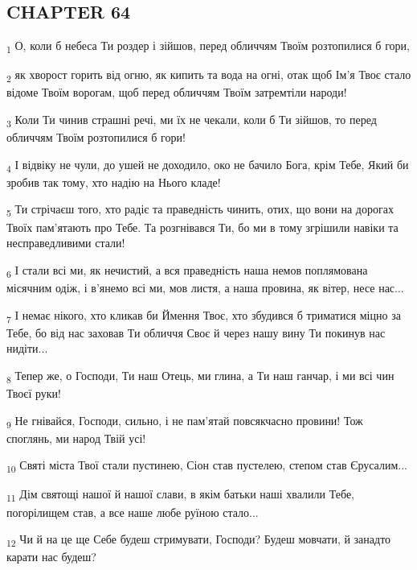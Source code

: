 \subsection{CHAPTER 64}
\begin{tcolorbox}
\textsubscript{1} О, коли б небеса Ти роздер і зійшов, перед обличчям Твоїм розтопилися б гори,
\end{tcolorbox}
\begin{tcolorbox}
\textsubscript{2} як хворост горить від огню, як кипить та вода на огні, отак щоб Ім'я Твоє стало відоме Твоїм ворогам, щоб перед обличчям Твоїм затремтіли народи!
\end{tcolorbox}
\begin{tcolorbox}
\textsubscript{3} Коли Ти чинив страшні речі, ми їх не чекали, коли б Ти зійшов, то перед обличчям Твоїм розтопилися б гори!
\end{tcolorbox}
\begin{tcolorbox}
\textsubscript{4} І відвіку не чули, до ушей не доходило, око не бачило Бога, крім Тебе, Який би зробив так тому, хто надію на Нього кладе!
\end{tcolorbox}
\begin{tcolorbox}
\textsubscript{5} Ти стрічаєш того, хто радіє та праведність чинить, отих, що вони на дорогах Твоїх пам'ятають про Тебе. Та розгнівався Ти, бо ми в тому згрішили навіки та несправедливими стали!
\end{tcolorbox}
\begin{tcolorbox}
\textsubscript{6} І стали всі ми, як нечистий, а вся праведність наша немов поплямована місячним одіж, і в'янемо всі ми, мов листя, а наша провина, як вітер, несе нас...
\end{tcolorbox}
\begin{tcolorbox}
\textsubscript{7} І немає нікого, хто кликав би Ймення Твоє, хто збудився б триматися міцно за Тебе, бо від нас заховав Ти обличчя Своє й через нашу вину Ти покинув нас нидіти...
\end{tcolorbox}
\begin{tcolorbox}
\textsubscript{8} Тепер же, о Господи, Ти наш Отець, ми глина, а Ти наш ганчар, і ми всі чин Твоєї руки!
\end{tcolorbox}
\begin{tcolorbox}
\textsubscript{9} Не гнівайся, Господи, сильно, і не пам'ятай повсякчасно провини! Тож споглянь, ми народ Твій усі!
\end{tcolorbox}
\begin{tcolorbox}
\textsubscript{10} Святі міста Твої стали пустинею, Сіон став пустелею, степом став Єрусалим...
\end{tcolorbox}
\begin{tcolorbox}
\textsubscript{11} Дім святощі нашої й нашої слави, в якім батьки наші хвалили Тебе, погорілищем став, а все наше любе руїною стало...
\end{tcolorbox}
\begin{tcolorbox}
\textsubscript{12} Чи й на це ще Себе будеш стримувати, Господи? Будеш мовчати, й занадто карати нас будеш?
\end{tcolorbox}
